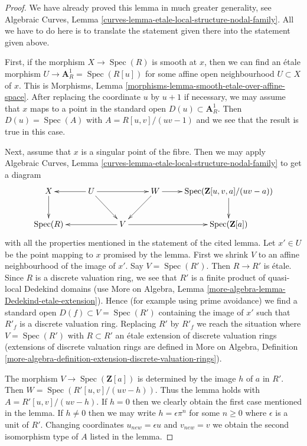 \documentclass[10pt,a4paper]{amsart}
\theoremstyle{plain}
\theoremstyle{definition}
\theoremstyle{remark}
\numberwithin{equation}{subsection}
\def\Spec{\mathop{\mathrm{Spec}}}
\begin{document}
\begin{proof}
We have already proved this lemma in much greater generality, see
Algebraic Curves, Lemma \ref{curves-lemma-etale-local-structure-nodal-family}.
All we have to do here is to translate the statement
given there into the statement given above.

\medskip\noindent
First, if the morphism $X \to \Spec(R)$ is smooth at $x$,
then we can find an \'etale morphism $U \to \mathbf{A}^1_R = \Spec(R[u])$ for
some affine open neighbourhood $U \subset X$ of $x$. This is
Morphisms, Lemma \ref{morphisms-lemma-smooth-etale-over-affine-space}.
After replacing the coordinate $u$ by $u + 1$ if necessary, we may
assume that $x$ maps to a point in the standard open
$D(u) \subset \mathbf{A}^1_R$. Then $D(u) = \Spec(A)$ with
$A = R[u, v]/(uv - 1)$ and we see that the result is true in this case.

\medskip\noindent
Next, assume that $x$ is a singular point of the fibre. Then we may apply
Algebraic Curves, Lemma \ref{curves-lemma-etale-local-structure-nodal-family}
to get a diagram
$$
\xymatrix{
X \ar[d] &
U \ar[rr] \ar[l] \ar[rd] & &
W \ar[r] \ar[ld] &
\Spec(\mathbf{Z}[u, v, a]/(uv - a)) \ar[d] \\
\Spec(R) & &
V \ar[ll] \ar[rr] & & \Spec(\mathbf{Z}[a])
}
$$
with all the properties mentioned in the statement of the cited lemma.
Let $x' \in U$ be the point mapping to $x$ promised by the lemma.
First we shrink $V$ to an affine neighbourhood of the image of $x'$.
Say $V = \Spec(R')$. Then $R \to R'$ is \'etale. Since $R$ is a
discrete valuation ring, we see that $R'$ is a finite
product of quasi-local Dedekind domains (use
More on Algebra, Lemma \ref{more-algebra-lemma-Dedekind-etale-extension}).
Hence (for example using prime avoidance) we find a standard
open $D(f) \subset V = \Spec(R')$ containing the image of $x'$
such that $R'_f$ is a discrete valuation ring.
Replacing $R'$ by $R'_f$ we reach the situation where
$V = \Spec(R')$ with $R \subset R'$ an \'etale extension of
discrete valuation rings (extensions of discrete valuation rings
are defined in More on Algebra, Definition
\ref{more-algebra-definition-extension-discrete-valuation-rings}).

\medskip\noindent
The morphism $V \to \Spec(\mathbf{Z}[a])$ is determined by
the image $h$ of $a$ in $R'$. Then $W = \Spec(R'[u, v]/(uv - h))$.
Thus the lemma holds with
$A = R'[u, v]/(uv - h)$. If $h = 0$ then we clearly
obtain the first case mentioned in the lemma. If $h \not = 0$
then we may write $h = \epsilon \pi^n$ for some $n \geq 0$
where $\epsilon$ is a unit of $R'$. Changing coordinates
$u_{new} = \epsilon u$ and $v_{new} = v$ we obtain the second
isomorphism type of $A$ listed in the lemma.
\end{proof}
\end{document}
